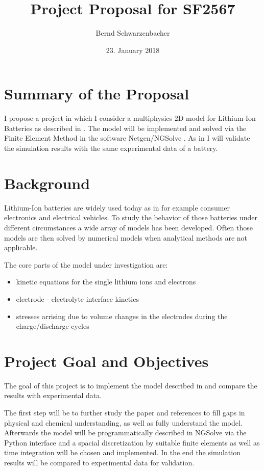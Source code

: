 \documentclass[a4paper]{article}
\title{Project Proposal for SF2567}
\author{Bernd Schwarzenbacher}
\date{23. January 2018}
\begin{document}
\maketitle

\section*{Summary of the Proposal}

I propose a project in which I consider a multiphysics 2D model for Lithium-Ion Batteries as
described in \cite{Garcia2005}.
The model will be implemented and solved via the Finite Element Method in the
software Netgen/NGSolve \cite{Netgen}\cite{NGSolve}.
As in \cite{Garcia2005} I will validate the simulation results with the same
experimental data of a  battery\cite{Doyle1995}.

\section*{Background}

Lithium-Ion batteries are widely used today as in for example consumer electronics and electrical vehicles.
To study the behavior of those batteries under different circumstances a wide
array of models has been developed.
Often those models are then solved by numerical models when analytical methods
are not applicable.

\noindent The core parts of the model under investigation are:
\begin{itemize}
  \item kinetic equations for the single lithium ions and electrons
  \item electrode - electrolyte interface kinetics
  \item stresses arrising due to volume changes in the electrodes during the charge/discharge cycles
\end{itemize}

\section*{Project Goal and Objectives}

The goal of this project is to implement the model described in
\cite{Garcia2005} and compare the results with experimental data.

The first step will be to further study the paper and references to fill gaps in physical and chemical understanding, as well as fully understand the model.
Afterwards the model will be programmatically described in NGSolve
\cite{NGSolve} via the Python interface and a spacial discretization by suitable
finite elements as well as time integration will be chosen and implemented.
In the end the simulation results will be compared to experimental data for validation.



\end{document}
